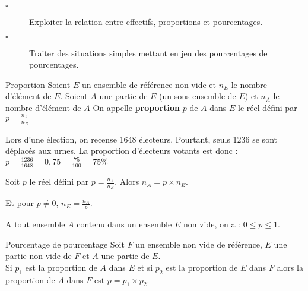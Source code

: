 \begin{titre}

\end{titre}


\begin{CpsCol}
\begin{description}
\item[$\square$] Exploiter la relation entre effectifs, proportions et pourcentages.
\item[$\square$] Traiter des situations simples mettant en jeu des pourcentages de pourcentages.
\end{description}
\end{CpsCol}

 

\begin{DefT}{Proportion}
Soient $E$ un ensemble de référence non vide et $n_E$ le nombre d'élément de $E$.
Soient $A$ une partie de $E$ (un sous ensemble de $E$) et $n_A$ le nombre d'élément de $A$
On appelle \textbf{proportion} $p$ de $A$ dans $E$ le réel défini par $p=\frac{n_A}{n_E}$ 
\end{DefT}

\begin{Ex}
Lors d'une élection, on recense 1648 électeurs. Pourtant, seuls 1236 se sont déplacés aux urnes. La proportion d'électeurs votants est donc : $p=\frac{1236}{1648}=0,75=\frac{75}{100}=75\%$ 
\end{Ex}



\begin{Th}
Soit $p$ le réel défini par $p=\frac{n_A}{n_E}$. Alors $n_A=p \times n_E$.

Et pour $p\neq 0$, $n_E=\frac{n_A}{p}$.
\end{Th}


\begin{Th}
A tout ensemble $A$ contenu dans un ensemble $E$ non vide, on a : $0 \leq p \leq 1$.
\end{Th}











\begin{ThT}{Pourcentage de pourcentage} 
Soit $F$ un ensemble non vide de référence, $E$ une partie non vide de $F$ et $A$ une partie de $E$.\\
Si $p_1$ est la proportion de $A$ dans $E$ et si $p_2$ est la proportion de $E$ dans $F$ alors la proportion de $A$ dans $F$ est $p=p_1 \times p_2$.
\end{ThT}

